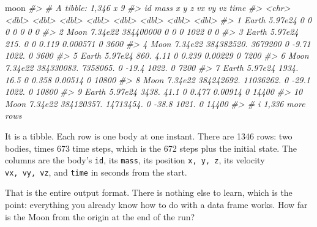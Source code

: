 \documentclass[
  10.5pt,
  letterpaper,
]{scrbook}
\newenvironment{Shaded}{\begin{snugshade}}{\end{snugshade}}
\newcommand{\CommentTok}[1]{\textcolor[rgb]{0.00,0.00,0.00}{\textit{#1}}}
\newcommand{\NormalTok}[1]{\textcolor[rgb]{0.00,0.00,0.00}{#1}}
\theoremstyle{definition}
\theoremstyle{plain}
\theoremstyle{remark}
\begin{document}
\begin{Shaded}
\begin{Highlighting}[]
\NormalTok{moon}
\CommentTok{\#\textgreater{} \# A tibble: 1,346 x 9}
\CommentTok{\#\textgreater{}    id       mass          x           y     z      vx          vy    vz  time}
\CommentTok{\#\textgreater{}    \textless{}chr\textgreater{}   \textless{}dbl\textgreater{}      \textless{}dbl\textgreater{}       \textless{}dbl\textgreater{} \textless{}dbl\textgreater{}   \textless{}dbl\textgreater{}       \textless{}dbl\textgreater{} \textless{}dbl\textgreater{} \textless{}dbl\textgreater{}}
\CommentTok{\#\textgreater{}  1 Earth 5.97e24         0         0        0   0        0            0     0}
\CommentTok{\#\textgreater{}  2 Moon  7.34e22 384400000         0        0   0     1022            0     0}
\CommentTok{\#\textgreater{}  3 Earth 5.97e24       215.        0        0   0.119    0.000571     0  3600}
\CommentTok{\#\textgreater{}  4 Moon  7.34e22 384382520.  3679200        0  {-}9.71  1022.           0  3600}
\CommentTok{\#\textgreater{}  5 Earth 5.97e24       860.        4.11     0   0.239    0.00229      0  7200}
\CommentTok{\#\textgreater{}  6 Moon  7.34e22 384330083.  7358065.       0 {-}19.4   1022.           0  7200}
\CommentTok{\#\textgreater{}  7 Earth 5.97e24      1934.       16.5      0   0.358    0.00514      0 10800}
\CommentTok{\#\textgreater{}  8 Moon  7.34e22 384242692. 11036262.       0 {-}29.1   1022.           0 10800}
\CommentTok{\#\textgreater{}  9 Earth 5.97e24      3438.       41.1      0   0.477    0.00914      0 14400}
\CommentTok{\#\textgreater{} 10 Moon  7.34e22 384120357. 14713454.       0 {-}38.8   1021.           0 14400}
\CommentTok{\#\textgreater{} \# i 1,336 more rows}
\end{Highlighting}
\end{Shaded}

It is a tibble. Each row is one body at one instant. There are 1346
rows: two bodies, times 673 time steps, which is the 672 steps plus the
initial state. The columns are the body's \texttt{id}, its
\texttt{mass}, its position \texttt{x,\ y,\ z}, its velocity
\texttt{vx,\ vy,\ vz}, and \texttt{time} in seconds from the start.

That is the entire output format. There is nothing else to learn, which
is the point: everything you already know how to do with a data frame
works. How far is the Moon from the origin at the end of the run?
\end{document}
